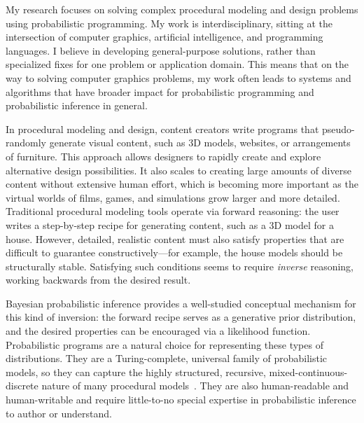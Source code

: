 \documentclass[
11pt, %
a4paper, %
oneside, %
headinclude,footinclude, %
BCOR5mm, %
]{scrartcl}
\title{\normalfont\spacedallcaps{Daniel Ritchie}} %
\author{\spacedallcaps{Research Statement}} %
\date{} %
\begin{document}

\pagestyle{scrheadings}
\clearscrheadings
\newcommand{\headertext}{\spacedlowsmallcaps{\color{black} Daniel Ritchie \color{halfgray} Research Statement}}
\ohead{\headertext}
\cfoot[\pagemark]{\pagemark}


\maketitle

My research focuses on solving complex procedural modeling and design problems using probabilistic programming. My work is interdisciplinary, sitting at the intersection of computer graphics, artificial intelligence, and programming languages. I believe in developing general-purpose solutions, rather than specialized fixes for one problem or application domain. This means that on the way to solving computer graphics problems, my work often leads to systems and algorithms that have broader impact for probabilistic programming and probabilistic inference in general.

In procedural modeling and design, content creators write programs that pseudo-randomly generate visual content, such as 3D models, websites, or arrangements of furniture. This approach allows designers to rapidly create and explore alternative design possibilities. It also scales to creating large amounts of diverse content without extensive human effort, which is becoming more important as the virtual worlds of films, games, and simulations grow larger and more detailed. Traditional procedural modeling tools operate via forward reasoning: the user writes a step-by-step recipe for generating content, such as a 3D model for a house. However, detailed, realistic content must also satisfy properties that are difficult to guarantee constructively---for example, the house models should be structurally stable. Satisfying such conditions seems to require \emph{inverse} reasoning, working backwards from the desired result.

Bayesian probabilistic inference provides a well-studied conceptual mechanism for this kind of inversion: the forward recipe serves as a generative prior distribution, and the desired properties can be encouraged via a likelihood function. Probabilistic programs are a natural choice for representing these types of distributions. They are a Turing-complete, universal family of probabilistic models, so they can capture the highly structured, recursive, mixed-continuous-discrete nature of many procedural models~\cite{Church}. They are also human-readable and human-writable and require little-to-no special expertise in probabilistic inference to author or understand.
\end{document}
